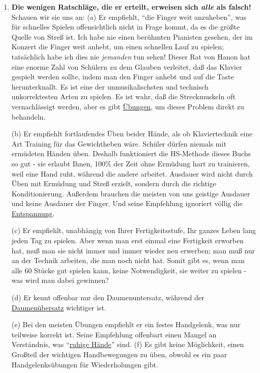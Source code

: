 \begin{enumerate}[label={\roman*.}]
\item \hypertarget{c1iii7h7}{}\textbf{Die wenigen Ratschläge, die er erteilt, erweisen sich \textit{alle} als falsch!}
Schauen wir sie uns an:
(a) Er empfiehlt, \enquote{die Finger weit anzuheben}, was für schnelles Spielen offensichtlich nicht in Frage kommt, da es die größte Quelle von Streß ist.
Ich habe nie einen berühmten Pianisten gesehen, der im Konzert die Finger weit anhebt, um einen schnellen Lauf zu spielen; tatsächlich habe ich dies nie \textit{jemanden} tun sehen!
Dieser Rat von Hanon hat eine enorme Zahl von Schülern zu dem Glauben verleitet, daß das Klavier gespielt werden sollte, indem man den Finger anhebt und auf die Taste herunterknallt.
Es ist eine der unmusikalischsten und technisch unkorrektesten Arten zu spielen.
Es ist wahr, daß die Streckmuskeln oft vernachlässigt werden, aber es gibt \hyperlink{c1iii7finger}{Übungen}, um dieses Problem direkt zu behandeln.

(b) Er empfiehlt fortlaufendes Üben beider Hände, als ob Klaviertechnik eine Art Training für das Gewichtheben wäre.
Schüler dürfen niemals mit ermüdeten Händen üben.
Deshalb funktioniert die HS-Methode dieses Buchs so gut - sie erlaubt Ihnen, 100\% der Zeit ohne Ermüdung hart zu trainieren, weil eine Hand ruht, während die andere arbeitet.
Ausdauer wird nicht durch Üben mit Ermüdung und Streß erzielt, sondern durch die richtige Konditionierung.
Außerdem brauchen die meisten von uns geistige Ausdauer und keine Ausdauer der Finger.
Und seine Empfehlung ignoriert völlig die \hyperlink{c1ii14}{Entspannung}.

(c) Er empfiehlt, unabhängig von Ihrer Fertigkeitsstufe, Ihr ganzes Leben lang jeden Tag zu spielen.
Aber wenn man erst einmal eine Fertigkeit erworben hat, muß man sie nicht immer und immer wieder neu erwerben; man muß nur an der Technik arbeiten, die man noch nicht hat.
Somit gibt es, wenn man alle 60 Stücke gut spielen kann, keine Notwendigkeit, sie weiter zu spielen - was wird man dabei gewinnen?

(d) Er kennt offenbar nur den Daumenuntersatz, während der \hyperlink{c1iii5a}{Daumenübersatz} wichtiger ist.

(e) Bei den meisten Übungen empfiehlt er ein festes Handgelenk, was nur teilweise korrekt ist.
Seine Empfehlung offenbart einen Mangel an Verständnis, was \enquote{\hyperlink{ruhig}{ruhige Hände}} sind.
(f) Es gibt keine Möglichkeit, einen Großteil der wichtigen Handbewegungen zu üben, obwohl es ein paar Handgelenksübungen für Wiederholungen gibt.




\end{enumerate}
